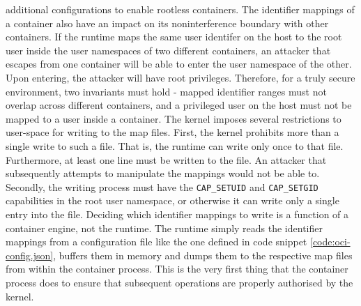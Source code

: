 additional configurations to enable rootless containers.
The identifier mappings of a container also have an impact on its noninterference boundary with 
other containers. If the runtime maps the same user identifer on the host to the root user inside the user namespaces of two different containers, an 
attacker that escapes from one container will be able to enter the user namespace of the other. Upon entering,
the attacker will have root privileges. Therefore, for a truly secure environment, two invariants must hold - 
mapped identifier ranges must not overlap across different containers, and a privileged user on the host must 
not be mapped to a user inside a container. The kernel imposes several restrictions to user-space for 
writing to the map files. First, the kernel prohibits more than a single write to such a file. 
That is, the runtime can write only once to that file. Furthermore, at least one line must be 
written to the file. An attacker that subsequently attempts to manipulate the mappings would not 
be able to. Secondly, the writing process must have the \verb|CAP_SETUID| and 
\verb|CAP_SETGID| capabilities in the root user namespace, or otherwise it can 
write only a single entry into the file. Deciding which identifier mappings to write is a function 
of a container engine, not the runtime. The runtime simply reads the identifier mappings
from a configuration file like the one defined in code snippet \ref{code:oci-config.json}, buffers 
them in memory and dumps them to the respective map files from within the container process.
This is the very first thing that the container process does to ensure that subsequent operations
are properly authorised by the kernel. 


